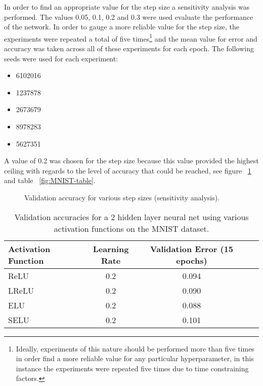 \documentclass{article}
\begin{document}
In order to find an appropriate value for the step size a sensitivity analysis was performed. The values 0.05, 0.1, 0.2 and 0.3 were used evaluate the performance of the network. In order to gauge a more reliable value for the step size, the experiments were repeated a total of five times\footnote{Ideally, experiments of this nature should be performed more than five times in order find a more reliable value for any particular hyperparameter, in this instance the experiments were repeated five times due to time constraining factors.} and the mean value for error and accuracy was taken across all of these experiments for each epoch. The following seeds were used for each experiment:

\begin{itemize}
  \item 6102016
  \item 1237878
  \item 2673679
  \item 8978283
  \item 5627351
\end{itemize}

A value of 0.2 was chosen for the step size because this value provided the highest ceiling with regards to the level of accuracy that could be reached, see figure ~\ref{fig:sens-analysis-val-acc} and table ~\ref{fig:MNIST-table}.

\begin{figure}[tb]
\vskip 5mm
\begin{center}
\centerline{}
\caption{Validation accuracy for various step sizes (sensitivity analysis).}
\label{fig:sens-analysis-val-acc}
\end{center}
\vskip -5mm
\end{figure}

\begin{table}[tb]
\vskip 3mm
\begin{center}
\begin{small}
\begin{sc}
\begin{tabular}{lcccr}
\hline
\abovespace\belowspace
Activation Function & Learning Rate & Validation Error (15 epochs) \\
\hline
\abovespace
ReLU    & 0.2& 0.094 \\
LReLU & 0.2& 0.090 \\
ELU    & 0.2& 0.088 \\
\belowspace
SELU    & 0.2& 0.101 \\
\hline
\end{tabular}
\end{sc}
\end{small}
\caption{Validation accuracies for a 2 hidden layer neural net using 
various activation functions on the MNIST dataset.}
\label{tab:MNIST-table}
\end{center}
\vskip -3mm
\end{table}
\end{document}
